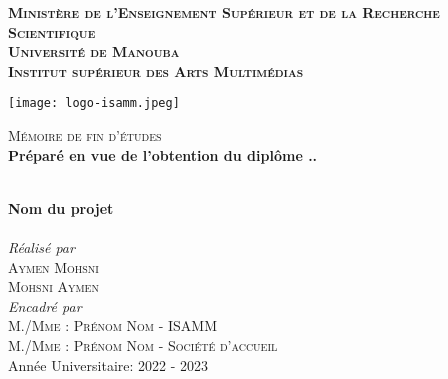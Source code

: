 \begin{center}
    


\begin{minipage}[l]{0.8\columnwidth}
\centering
\large
\textbf{\textsc{Ministère de l'Enseignement Supérieur et de la Recherche Scientifique}}\\
\medskip 
\textbf{\textsc{Université de Manouba}}\\
\medskip 
\textbf{\textsc{Institut supérieur des Arts Multimédias}}

\vspace{0.5cm}
\texttt{[image: logo-isamm.jpeg]}
\end{minipage}
\hfill


\vskip1cm
\textsc{\large Mémoire de fin d'études}\\[0.5cm] %

\textbf{Préparé en vue de l'obtention du diplôme ..}

\vskip1cm%


\HRule \\[0.4cm]
{ \LARGE \bfseries Nom du projet}\\[0.3cm] %
\HRule \\[1cm]


\textit{Réalisé par}\\
\vskip0.5cm
\textsc{\large Aymen Mohsni}\\[0.5cm] %
\textsc{\large Mohsni Aymen}\\[0.5cm] %

\vspace{1cm}
\textit{Encadré par}\\ 
\vskip0.5cm
\textsc{\large M./Mme : Prénom Nom - ISAMM}\\[0.5cm] %
\textsc{\large M./Mme : Prénom Nom - Société d'accueil}\\[0.5cm] %

\vspace{1cm}
{\large Année Universitaire: 2022 - 2023}\\[1cm] 




%

\end{center}
